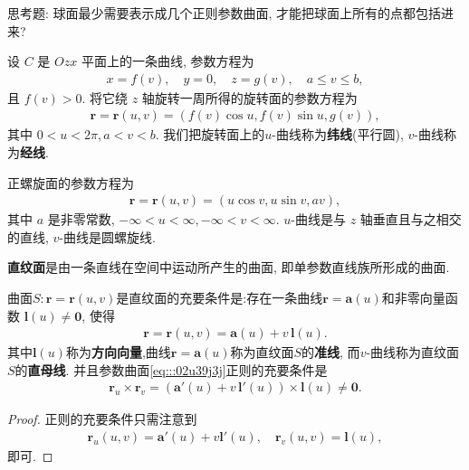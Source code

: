 \documentclass[../../main.tex]{subfiles}%
\begin{document}
\begin{remark}
思考题: 球面最少需要表示成几个正则参数曲面, 才能把球面上所有的点都包括进来?
\end{remark}

\begin{example}[旋转面]
设 \( C \) 是 \( Ozx \) 平面上的一条曲线, 参数方程为
\begin{align*}
x = f(v),\quad y = 0,\quad z = g(v),\quad a \leqslant v \leqslant b,
\end{align*}
且 \( f(v) > 0 \). 将它绕 \( z \) 轴旋转一周所得的旋转面的参数方程为
\begin{align*}
\bm{r} = \bm{r}(u, v) = (f(v)\cos u, f(v)\sin u, g(v)),
\end{align*}
其中 \( 0 < u < 2\pi, a < v < b \). 我们把旋转面上的\( u \)-曲线称为\textbf{纬线}(平行圆), \( v \)-曲线称为\textbf{经线}.
\end{example}

\begin{example}[正螺旋面]
正螺旋面的参数方程为
\begin{align*}
\bm{r} = \bm{r}(u, v) = (u\cos v, u\sin v, av),
\end{align*}
其中 \( a \) 是非零常数, \( -\infty < u < \infty, -\infty < v < \infty \). \( u \)-曲线是与 \( z \) 轴垂直且与之相交的直线, \( v \)-曲线是圆螺旋线.
\end{example}

\begin{definition}[直纹面]
\textbf{直纹面}是由一条直线在空间中运动所产生的曲面, 即单参数直线族所形成的曲面. 
\end{definition}

\begin{theorem}
曲面$S:\bm{r}=\bm{r}(u,v)$是直纹面的充要条件是:存在一条曲线\( \bm{r} = \bm{a}(u) \)和非零向量函数 \( \bm{l}(u) \neq \bm{0} \), 使得
\begin{align}\label{eq:::02u39j3j}
\bm{r} = \bm{r}(u, v) = \bm{a}(u) + v\,\bm{l}(u).
\end{align}
其中$\bm{l}(u)$称为\textbf{方向向量},曲线\( \bm{r} = \bm{a}(u) \)称为直纹面$S$的\textbf{准线},
而\( v \)-曲线称为直纹面$S$的\textbf{直母线}. 并且参数曲面\eqref{eq:::02u39j3j}正则的充要条件是
\begin{align*}
\bm{r}_u \times \bm{r}_v = (\bm{a}'(u) + v\,\bm{l}'(u)) \times \bm{l}(u) \neq \bm{0}.
\end{align*}
\end{theorem}
\begin{proof}

正则的充要条件只需注意到
\begin{align*}
\bm{r}_u(u,v)=\bm{a}'(u)+v\bm{l}'(u),\quad \bm{r}_v(u,v)=\bm{l}(u),
\end{align*}
即可.

\end{proof}
\end{document}
